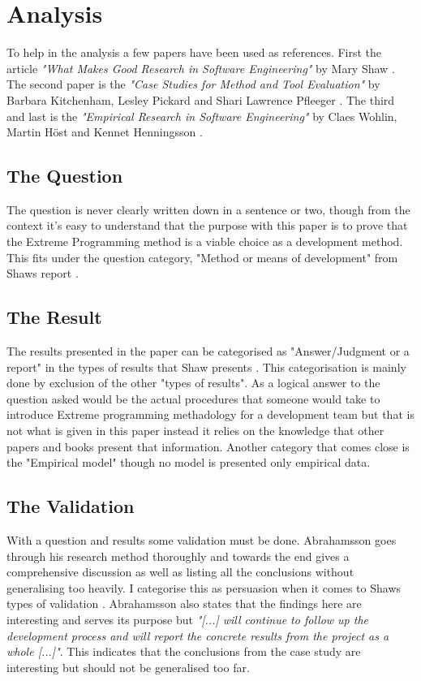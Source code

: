 \section{Analysis}
To help in the analysis a few papers have been used as references. First the
article {\em "What Makes Good Research in Software Engineering"} by Mary Shaw
\cite{shaw2002}. The second paper is the {\em "Case Studies for Method and Tool
Evaluation"} by Barbara Kitchenham, Lesley Pickard and Shari Lawrence Pfleeger
\cite{kitchenham1995}. The third and last is the {\em "Empirical Research in
Software Engineering"} by Claes Wohlin, Martin H\"{o}st and Kennet Henningsson
\cite{wohlin2003}.

\subsection{The Question}
The question is never clearly written down in a sentence or two, though from the
context it's easy to understand that the purpose with this paper is to prove that
the Extreme Programming method is a viable choice as a development method. This
fits under the question category, "Method or means of development" from Shaws
report \cite{shaw2002}.

\subsection{The Result}
The results presented in the paper can be categorised as "Answer/Judgment or a
report" in the types of results that Shaw presents \cite{shaw2002}. This
categorisation is mainly done by exclusion of the other "types of results". As
a logical answer to the question asked would be the actual procedures that
someone would take to introduce Extreme programming methadology for a development team but that is not what is
given in this paper instead it relies on the knowledge that other papers and books
present that information. Another category that comes close is the "Empirical
model" though no model is presented only empirical data.

\subsection{The Validation}
With a question and results some validation must be done. Abrahamsson goes
through his research method thoroughly and towards the end gives a
comprehensive discussion as well as listing all the conclusions without generalising
too heavily. I categorise this as persuasion when it comes to Shaws types of
validation \cite{shaw2002}. Abrahamsson also states that the findings here are
interesting and serves its purpose but {\em "[...] will continue to follow up
    the development process and will report the concrete results from the
project as a whole [...]"}. This indicates that the conclusions from the
    case study are interesting but should not be generalised too far.
